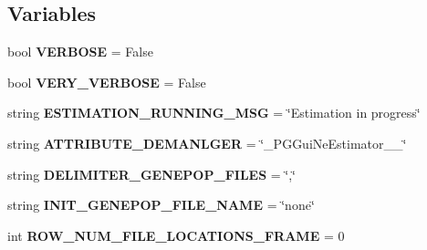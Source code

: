 \subsection*{Variables}
\begin{DoxyCompactItemize}
\item 
bool {\bfseries V\+E\+R\+B\+O\+SE} = False\hypertarget{namespacenegui_1_1pgguineestimator__experimental_a51a693dcc76f65357f48a84047dd58cc}{}\label{namespacenegui_1_1pgguineestimator__experimental_a51a693dcc76f65357f48a84047dd58cc}

\item 
bool {\bfseries V\+E\+R\+Y\+\_\+\+V\+E\+R\+B\+O\+SE} = False\hypertarget{namespacenegui_1_1pgguineestimator__experimental_a9e302e93edb378ed8a321d70da42c92c}{}\label{namespacenegui_1_1pgguineestimator__experimental_a9e302e93edb378ed8a321d70da42c92c}

\item 
string {\bfseries E\+S\+T\+I\+M\+A\+T\+I\+O\+N\+\_\+\+R\+U\+N\+N\+I\+N\+G\+\_\+\+M\+SG} = \char`\"{}Estimation in progress\char`\"{}\hypertarget{namespacenegui_1_1pgguineestimator__experimental_a3a7f1c28038164d5a9624dca8d7d4d9e}{}\label{namespacenegui_1_1pgguineestimator__experimental_a3a7f1c28038164d5a9624dca8d7d4d9e}

\item 
string {\bfseries A\+T\+T\+R\+I\+B\+U\+T\+E\+\_\+\+D\+E\+M\+A\+N\+L\+G\+ER} = \char`\"{}\+\_\+\+P\+G\+Gui\+Ne\+Estimator\+\_\+\+\_\+\char`\"{}\hypertarget{namespacenegui_1_1pgguineestimator__experimental_ac223740a1a339c6655b9f8c25dd6dd84}{}\label{namespacenegui_1_1pgguineestimator__experimental_ac223740a1a339c6655b9f8c25dd6dd84}

\item 
string {\bfseries D\+E\+L\+I\+M\+I\+T\+E\+R\+\_\+\+G\+E\+N\+E\+P\+O\+P\+\_\+\+F\+I\+L\+ES} = \char`\"{},\char`\"{}\hypertarget{namespacenegui_1_1pgguineestimator__experimental_a4d2403af544984d49891611b05a73cae}{}\label{namespacenegui_1_1pgguineestimator__experimental_a4d2403af544984d49891611b05a73cae}

\item 
string {\bfseries I\+N\+I\+T\+\_\+\+G\+E\+N\+E\+P\+O\+P\+\_\+\+F\+I\+L\+E\+\_\+\+N\+A\+ME} = \char`\"{}none\char`\"{}\hypertarget{namespacenegui_1_1pgguineestimator__experimental_a6a68360e9de3aadd1f99b7ed540344f0}{}\label{namespacenegui_1_1pgguineestimator__experimental_a6a68360e9de3aadd1f99b7ed540344f0}

\item 
int {\bfseries R\+O\+W\+\_\+\+N\+U\+M\+\_\+\+F\+I\+L\+E\+\_\+\+L\+O\+C\+A\+T\+I\+O\+N\+S\+\_\+\+F\+R\+A\+ME} = 0\hypertarget{namespacenegui_1_1pgguineestimator__experimental_a7328f1ac139eb564ccb7bf0b69083c82}{}\label{namespacenegui_1_1pgguineestimator__experimental_a7328f1ac139eb564ccb7bf0b69083c82}


\end{DoxyCompactItemize}
